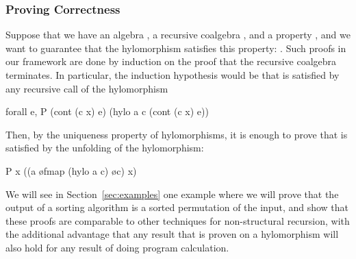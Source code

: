\documentclass[a4paper,anonymous, UKenglish,cleveref, autoref, thm-restate]{lipics-v2021}
\begin{document}
\subsubsection{Proving Correctness}

Suppose that we have an algebra , a recursive coalgebra
, and a property , and we want to
guarantee that the hylomorphism satisfies this property:
.
Such proofs in our framework are done by induction on the proof that the
recursive coalgebra terminates. In particular, the induction hypothesis would be
that  is satisfied by any recursive call of the hylomorphism
\begin{coqcode}
forall e, P (cont (c x) e) (hylo a c (cont (c x) e))
\end{coqcode}
\noindent
Then, by the uniqueness property of hylomorphisms, it is enough to prove that
 is satisfied by the unfolding of the hylomorphism:
\begin{coqcode}
P x ((a \o fmap (hylo a c) \o c) x)
\end{coqcode}
We will see in Section~\ref{sec:examples} one example where we will prove that
the output of a sorting algorithm is a sorted permutation of the input, and
show that these proofs are comparable to other techniques for non-structural
recursion, with the additional advantage that any result that is proven on a
hylomorphism will also hold for any result of doing program calculation.
\end{document}
